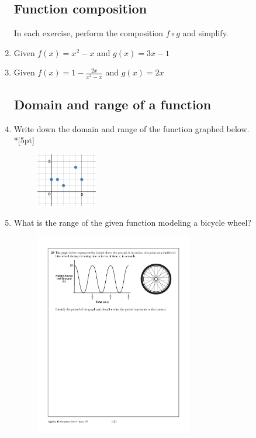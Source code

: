 \documentclass[]{book}
\begin{document}
\begin{enumerate}
\subsection*{Function composition}
In each exercise, perform the composition $f \circ g$ and simplify.
\item Given $f(x)=x^2-x$ and $g(x)=3x-1$
\item Given $\displaystyle f(x)=1-\frac{2x}{x^2-x}$ and $g(x)=2x$

\subsection*{Domain and range of a function}
\item Write down the domain and range of the function graphed below.\\*[5pt]

\begin{figure}[!ht]
    \centering
    \includegraphics[width=0.25\textwidth]{discrete-domain-graph.jpeg}
\end{figure}

\item What is the range of the given function modeling a bicycle wheel?

\begin{figure}[!ht]
    \centering
    \includegraphics[width=0.65\textwidth]{sine-bike-wheel.pdf}
\end{figure}


\end{enumerate}
\end{document}
